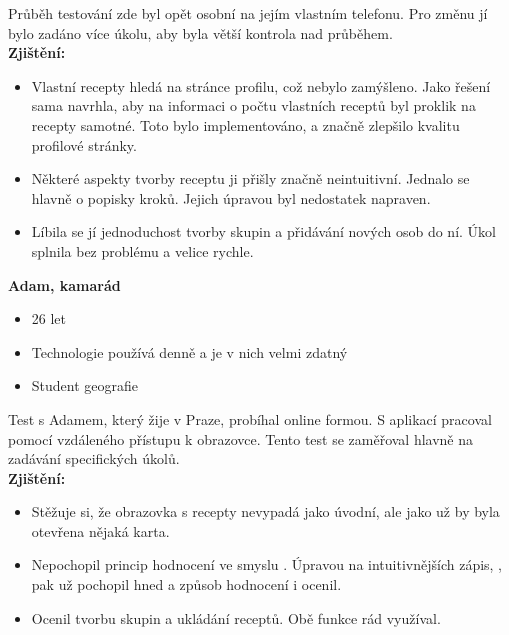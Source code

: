 \documentclass[a4paper, 11pt]{article}
\begin{document}
Průběh testování zde byl opět osobní na jejím vlastním telefonu. Pro změnu jí bylo zadáno více
úkolu, aby byla větší kontrola nad průběhem. \\

\textbf{Zjištění:}
\begin{itemize}
    \item Vlastní recepty hledá na stránce profilu, což nebylo zamýšleno. Jako řešení sama navrhla, 
    aby na informaci o počtu vlastních receptů byl proklik na recepty samotné. Toto bylo implementováno,
    a značně zlepšilo kvalitu profilové stránky.

    \item Některé aspekty tvorby receptu ji přišly značně neintuitivní. Jednalo se hlavně o popisky
    kroků. Jejich úpravou byl nedostatek napraven.

    \item Líbila se jí jednoduchost tvorby skupin a přidávání nových osob do ní.
    Úkol splnila bez problému a velice rychle.
\end{itemize}


\noindent\textbf{Adam, kamarád} \\[-1em]
\begin{itemize}
    \item 26 let
    \item Technologie používá denně a je v nich velmi zdatný
    \item Student geografie
\end{itemize}

Test s Adamem, který žije v Praze, probíhal online formou. S aplikací pracoval pomocí vzdáleného
přístupu k obrazovce. Tento test se zaměřoval hlavně na zadávání specifických úkolů. \\

\textbf{Zjištění:}
\begin{itemize}
    \item Stěžuje si, že obrazovka s recepty nevypadá jako úvodní, ale jako už by byla otevřena
    nějaká karta.

    \item Nepochopil princip hodnocení ve smyslu . Úpravou
    na intuitivnějších zápis, , pak už pochopil hned
    a způsob hodnocení i ocenil.

    \item Ocenil tvorbu skupin a ukládání receptů. Obě funkce rád využíval.
\end{itemize}
\end{document}
